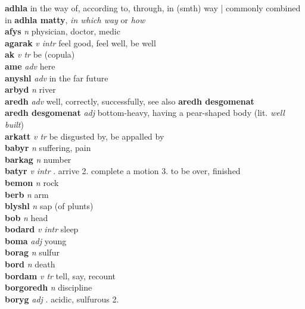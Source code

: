 \textbf{adhla}    \textperiodcentered in the way of, according to, through, in (smth) way | commonly combined in \textbf{adhla matty}, \emph{in which way} or \emph{how}\\\textbf{afys}   \emph{n} \textperiodcentered physician, doctor, medic\\\textbf{agarak}   \emph{v intr} \textperiodcentered feel good, feel well, be well\\\textbf{ak}   \emph{v tr} \textperiodcentered be (copula)\\\textbf{ame}   \emph{adv} \textperiodcentered here\\\textbf{anyshl}   \emph{adv} \textperiodcentered in the far future\\\textbf{arbyd}   \emph{n} \textperiodcentered river\\\textbf{aredh}   \emph{adv} \textperiodcentered well, correctly, successfully, see also \textbf{aredh desgomenat}\\\textbf{aredh desgomenat}   \emph{adj} \textperiodcentered bottom-heavy, having a pear-shaped body (lit. \emph{well built})\\\textbf{arkatt}   \emph{v tr} \textperiodcentered be disgusted by, be appalled by\\\textbf{babyr}   \emph{n} \textperiodcentered suffering, pain\\\textbf{barkag}   \emph{n} \textperiodcentered number\\\textbf{batyr}   \emph{v intr} . arrive 2. complete a motion 3. to be over, finished \\\textbf{bemon}   \emph{n} \textperiodcentered rock\\\textbf{berb}   \emph{n} \textperiodcentered arm\\\textbf{blyshl}   \emph{n} \textperiodcentered sap (of plunts)\\\textbf{bob}   \emph{n} \textperiodcentered head\\\textbf{bodard}   \emph{v intr} \textperiodcentered sleep\\\textbf{boma}   \emph{adj} \textperiodcentered young\\\textbf{borag}   \emph{n} \textperiodcentered sulfur\\\textbf{bord}   \emph{n} \textperiodcentered death\\\textbf{bordam}   \emph{v tr} \textperiodcentered tell, say, recount\\\textbf{borgoredh}   \emph{n} \textperiodcentered discipline\\\textbf{boryg}   \emph{adj} . acidic, sulfurous 2. 